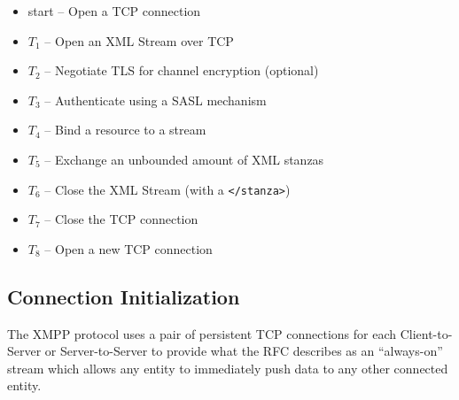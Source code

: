 \documentclass{article}
\begin{document}
        \begin{figure}[!h]
            \centering
        \end{figure}
\begin{itemize}
    \item start -- Open a TCP connection
    \item $T_{1}$ -- Open an XML Stream over TCP
    \item $T_{2}$ -- Negotiate TLS for channel encryption (optional)
    \item $T_{3}$ -- Authenticate using a SASL mechanism
    \item $T_{4}$ -- Bind a resource to a stream
    \item $T_{5}$ -- Exchange an unbounded amount of XML stanzas
    \item $T_{6}$ -- Close the XML Stream (with a \texttt{</stanza>}) 
    \item $T_{7}$ -- Close the TCP connection 
    \item $T_{8}$ -- Open a new TCP connection 
\end{itemize}
\subsection{Connection Initialization}
The XMPP protocol uses a pair of persistent TCP connections for each
Client-to-Server or Server-to-Server to provide what the RFC describes as an
``always-on'' stream which allows any entity to immediately push data to any
other connected entity.
\end{document}
